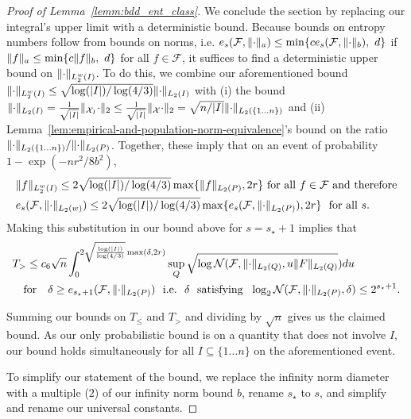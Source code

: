 \documentclass{article}
\DeclarePairedDelimiter\norm{\lVert}{\rVert}
\DeclarePairedDelimiter\abs{\lvert}{\rvert}
\theoremstyle{definition}
\newcommand{\calF}{\ensuremath{\mathcal{F}}}
\newcommand{\calN}{\ensuremath{\mathcal{N}}}
\newcommand{\calX}{\ensuremath{\mathcal{X}}}
\newcommand{\qfor}{\quad \text{for} \quad}
\newcommand{\F}{\ensuremath{\mathcal{F}}}
\let\P\relax
\DeclareMathOperator{\P}{P}
\newcommand{\<}{\langle}
\renewcommand{\>}{\rangle}
\begin{document}
\begin{refsection}
\begin{proof}[Proof of Lemma~\ref{lemm:bdd_ent_class}]
We conclude the section by replacing our integral's upper limit with a deterministic bound. Because bounds on entropy numbers follow from bounds on norms, i.e. $e_s(\F, \norm{\cdot}_a) \le \min\{c e_s(\F, \norm{\cdot}_b), \  d\} $ if $\norm{f}_a \le \min\{c\norm{f}_b, \ d\}$ for all $f \in \F$, it suffices to find a deterministic upper bound on $\norm{\cdot}_{L_2^w(I)}$. To  do this, we combine our aforementioned bound $\norm{\cdot}_{L_2^w(I)} \le \sqrt{\log(\abs{I})/\log(4/3)}\norm{\cdot}_{L_2(I)}$ with (i)
the bound $\norm{\cdot}_{L_2(I)} = \frac{1}{\sqrt{\abs{I}}}\norm{\P_{\calX_I} \cdot}_2 \le \frac{1}{\sqrt{\abs{I}}}\norm{\P_{\calX} \cdot}_2 = \sqrt{n/\abs{I}}\norm{\cdot}_{L_2(\{1 \ldots n\})}$ and (ii) Lemma~\ref{lem:empirical-and-population-norm-equivalence}'s bound on the ratio $\norm{\cdot}_{L_2(\{1 \ldots n\})}/\norm{\cdot}_{L_2(P)}$. Together,  these imply that on an event of probability $1-\exp(-nr^2/8b^2)$,
$$
\begin{aligned}
&\norm{f}_{L_2^w(I)} \le 2\sqrt{\log(\abs{I})/\log(4/3)}\max\{\norm{f}_{L_2(P)}, 2r\} \ \text{for all $f \in \F$ and therefore} \\
&e_s(\F, \norm{\cdot}_{L_2(w)}) \le 2\sqrt{\log(\abs{I})/\log(4/3)}\max\{ e_s(\F, \norm{\cdot}_{L_2(P)}), 2r\} \ \ \text{for all $s$.}
\end{aligned}
$$
Making this substitution in our bound above for $s=s_\star+1$ implies that
$$
\begin{aligned}
&T_{>} \le c_6 \sqrt{n}\int_0^{2\sqrt{\frac{\log(\abs{I})}{\log(4/3)}}\max(\delta,2r)}  \sup_{Q} \sqrt{\log\calN(\calF, \norm{\cdot}_{L_2(Q)}, u\norm{F}_{L_2(Q)}}) du \\
&\qfor \delta \ge e_{s_\star+1}(\F, \norm{\cdot}_{L_2(P)}) \ \ \text{i.e.} \ \  \delta \ \text{ satisfying }  \ \log_2 \calN(\calF, \norm{\cdot}_{L_2(P)}, \delta) \le 2^{s_\star+1}.
\end{aligned}
$$

Summing our bounds on $T_\le$ and $T_>$ and dividing by $\sqrt{n}$ gives us the claimed bound. As our only probabilistic bound is on a quantity
that does not involve $I$, our bound holds simultaneously for all $I \subseteq \{ 1 \ldots n \}$ on the aforementioned event.

To simplify our statement of the bound, we replace the infinity norm diameter with a multiple ($2$) of our infinity norm bound $b$,
rename $s_\star$ to $s$, and simplify and rename our universal constants.
\end{proof}



\end{refsection}
\end{document}
